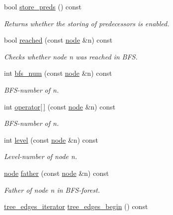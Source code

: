 \begin{DoxyCompactItemize}
bool \mbox{\hyperlink{classbfs_ac4373b51885382f6f1a9312c1b0923bd}{store\+\_\+preds}} () const
\begin{DoxyCompactList}\small\item\em Returns whether the storing of predecessors is enabled. \end{DoxyCompactList}\item 
bool \mbox{\hyperlink{classbfs_ab1a7882a7d56e0e72bbe1a344381bdae}{reached}} (const \mbox{\hyperlink{classnode}{node}} \&n) const
\begin{DoxyCompactList}\small\item\em Checks whether node {\itshape n} was reached in B\+FS. \end{DoxyCompactList}\item 
int \mbox{\hyperlink{classbfs_a6205cc191bc0bedf1ff9d74af0925735}{bfs\+\_\+num}} (const \mbox{\hyperlink{classnode}{node}} \&n) const
\begin{DoxyCompactList}\small\item\em B\+F\+S-\/number of {\itshape n}. \end{DoxyCompactList}\item 
int \mbox{\hyperlink{classbfs_addc2a3d0a275007455d22f6b76830e66}{operator\mbox{[}$\,$\mbox{]}}} (const \mbox{\hyperlink{classnode}{node}} \&n) const
\begin{DoxyCompactList}\small\item\em B\+F\+S-\/number of {\itshape n}. \end{DoxyCompactList}\item 
int \mbox{\hyperlink{classbfs_ac0158a0453fb17a89be4049d21db56b1}{level}} (const \mbox{\hyperlink{classnode}{node}} \&n) const
\begin{DoxyCompactList}\small\item\em Level-\/number of node {\itshape n}. \end{DoxyCompactList}\item 
\mbox{\hyperlink{classnode}{node}} \mbox{\hyperlink{classbfs_a3e1a7b0e4bde586d0be44616e533c59c}{father}} (const \mbox{\hyperlink{classnode}{node}} \&n) const
\begin{DoxyCompactList}\small\item\em Father of node {\itshape n} in B\+F\+S-\/forest. \end{DoxyCompactList}\item 
\mbox{\hyperlink{classbfs_a04e608fe18089e5495cadb995aa75261}{tree\+\_\+edges\+\_\+iterator}} \mbox{\hyperlink{classbfs_a56959215efdfee1a37826ad315ac13e7}{tree\+\_\+edges\+\_\+begin}} () const

\end{DoxyCompactItemize}
